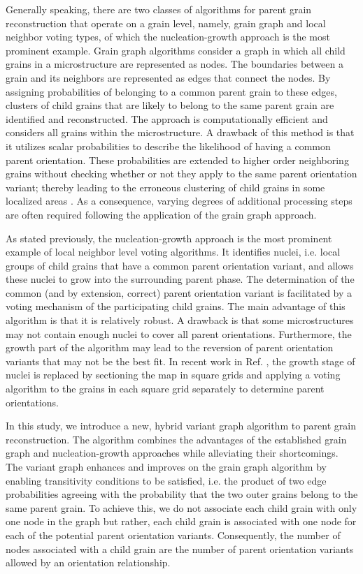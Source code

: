 \documentclass{elsarticle}
\numberwithin{equation}{section}
\begin{document}
Generally speaking, there are two classes of algorithms for parent grain reconstruction that operate on a grain level, namely, grain graph \cite{Brust2021,Nyyssonen2016,GomesdeAraujo2021} and local neighbor voting types, of which the nucleation-growth approach \cite{Cayron2006,Germain2012,Bernier2014} is the most prominent example. Grain graph algorithms consider a graph in which all child grains in a microstructure are represented as nodes. The boundaries between a grain and its neighbors are represented as edges that connect the nodes. By assigning probabilities of belonging to a common parent grain to these edges, clusters of child grains that are likely to belong to the same parent grain are identified and reconstructed. The approach is computationally efficient and considers all grains within the microstructure. A drawback of this method is that it utilizes scalar probabilities to describe the likelihood of having a common parent orientation. These probabilities are extended to higher order neighboring grains without checking whether or not they apply to the same parent orientation variant; thereby leading to the erroneous clustering of child grains in some localized areas \cite{Nyyssonen2016,GomesdeAraujo2021}. As a consequence, varying degrees of additional processing steps are often required following the application of the grain graph approach.

As stated previously, the nucleation-growth approach is the most prominent example of local neighbor level voting algorithms. It identifies nuclei, i.e. local groups of child grains that have a common parent orientation variant, and allows these nuclei to grow into the surrounding parent phase. The determination of the common (and by extension, correct) parent orientation variant is facilitated by a voting mechanism of the participating child grains. The main advantage of this algorithm is that it is relatively robust. A drawback is that some microstructures may not contain enough nuclei to cover all parent orientations. Furthermore, the growth part of the algorithm may lead to the reversion of parent orientation variants that may not be the best fit. In recent work in Ref. \cite{Huang2020}, the growth stage of nuclei is replaced by sectioning the map in square grids and applying a voting algorithm to the grains in each square grid separately to determine parent orientations.

In this study, we introduce a new, hybrid variant graph algorithm to parent grain reconstruction. The algorithm combines the advantages of the established grain graph and nucleation-growth approaches while alleviating their shortcomings. The variant graph enhances and improves on the grain graph algorithm by enabling transitivity conditions to be satisfied, i.e. the product of two edge probabilities agreeing with the probability that the two outer grains belong to the same parent grain. To achieve this, we do not associate each child grain with only one node in the graph but rather, each child grain is associated with one node for each of the potential parent orientation variants. Consequently, the number of nodes associated with a child grain are the number of parent orientation variants allowed by an orientation relationship. 
\end{document}
